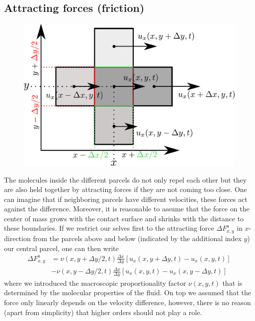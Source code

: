 \documentclass[10pt,a4paper]{article}
\begin{document}
\subsection{Attracting forces (friction)}

\begin{figure}[H]
\begin{center}
\includegraphics[scale=0.7]{attracting_forces.pdf}
\end{center}
\end{figure}
%
The molecules inside the different parcels do not only repel each other but they are also held together by attracting forces if they are not coming too close.
%
One can imagine that if neighboring parcels have different velocities, these forces act against the difference.
%
Moreover, it is reasonable to assume that the force on the center of mass grows with the contact surface and shrinks with the distance to these boundaries.
%
If we restrict our selves first to the attracting force $\Delta F^a_{x, y}$ in $x$-direction from the parcels above and below (indicated by the additional index $y$) our central parcel, one can then write
%
\begin{align}
\Delta F^a_{x, y} & =   \nu(x, y+\Delta y/2, t) \frac{\Delta x}{\Delta y} [u_x(x, y+\Delta y, t) - u_x(x, y, t)] \\
& - \nu(x, y-\Delta y/2, t) \frac{\Delta x}{\Delta y} [u_x(x, y, t)-u_x(x, y-\Delta y, t)] 
\end{align}
%
where we introduced the macroscopic proportionality factor $\nu(x,y,t)$ that is determined by the molecular properties of the fluid.
%
On top we assumed that the force only linearly depends on the velocity difference, however, there is no reason (apart from simplicity) that higher orders should not play a role.
\end{document}
